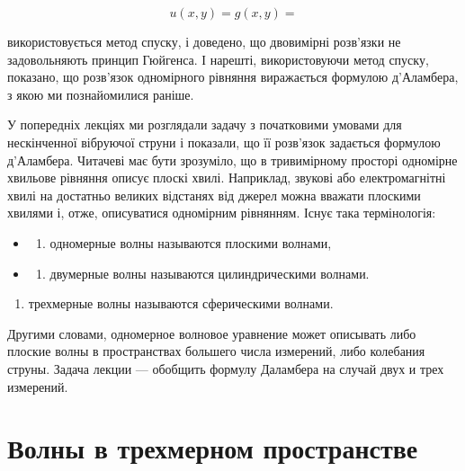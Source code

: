\documentclass[
  ukrainian,
]{article}
\providecommand{\tightlist}{%
  \setlength{\itemsep}{0pt}\setlength{\parskip}{0pt}}
\begin{document}
\[
u(x,y) = g(x,y) =
\]

використовується метод спуску, і доведено, що двовимірні розв'язки не
задовольняють принцип Гюйгенса. І нарешті, використовуючи метод спуску,
показано, що розв'язок одномірного рівняння виражається формулою
д'Аламбера, з якою ми познайомилися раніше.

У попередніх лекціях ми розглядали задачу з початковими умовами для
нескінченної вібруючої струни і показали, що її розв'язок задається
формулою д'Аламбера. Читачеві має бути зрозуміло, що в тривимірному
просторі одномірне хвильове рівняння описує плоскі хвилі. Наприклад,
звукові або електромагнітні хвилі на достатньо великих відстанях від
джерел можна вважати плоскими хвилями і, отже, описуватися одномірним
рівнянням. Існує така термінологія:

\begin{itemize}
\tightlist
\item
  \begin{enumerate}
  \def\labelenumi{\arabic{enumi})}
  \tightlist
  \item
    одномерные волны называются плоскими волнами,
  \end{enumerate}
\item
  \begin{enumerate}
  \def\labelenumi{\arabic{enumi})}
  \setcounter{enumi}{1}
  \tightlist
  \item
    двумерные волны называются цилиндрическими волнами.
  \end{enumerate}
\end{itemize}

\begin{enumerate}
\def\labelenumi{\arabic{enumi})}
\setcounter{enumi}{2}
\tightlist
\item
  трехмерные волны называются сферическими волнами.
\end{enumerate}

Другими словами, одномерное волновое уравнение может описывать либо
плоские волны в пространствах большего числа измерений, либо колебания
струны. Задача лекции --- обобщить формулу Даламбера на случай двух и
трех измерений.

\section{Волны в трехмерном
пространстве}\label{ux432ux43eux43bux43dux44b-ux432-ux442ux440ux435ux445ux43cux435ux440ux43dux43eux43c-ux43fux440ux43eux441ux442ux440ux430ux43dux441ux442ux432ux435}
\end{document}
